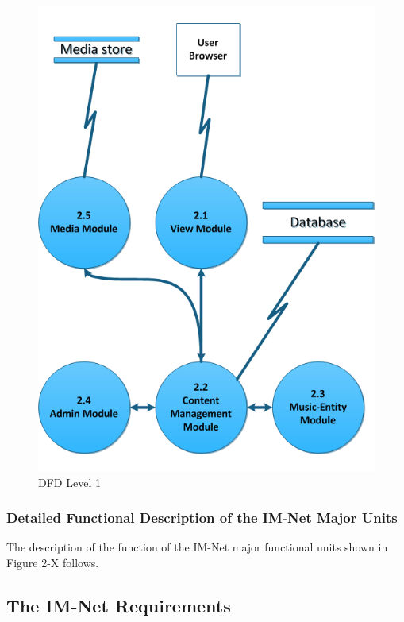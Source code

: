 \documentclass[letterpaper]{article}
\begin{document}
{\begin{figure}[h!]
\centering
\includegraphics{DFD_level_1.png}
\caption{DFD Level 1}
\label{fig:DFD_level_1}
\end{figure}
\eject
 
\textcolor{subsubsection}{\subsubsection{Detailed Functional Description of the IM-Net Major Units}}

The description of the function of the IM-Net major functional units shown in Figure 2-X follows.

\eject

\textcolor{section}{\section{The IM-Net Requirements}}
 
}
\end{document}
